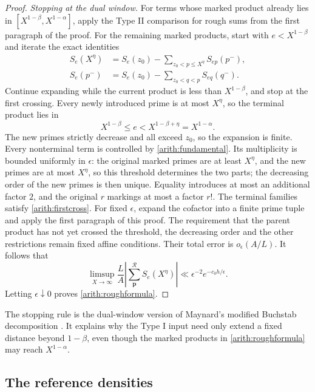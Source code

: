 \documentclass[11pt,a4paper]{article}
\theoremstyle{paperplain}
\numberwithin{equation}{section}
\begin{document}
\begin{proof}
\smallskip\noindent\emph{Stopping at the dual window.}\quad
For terms whose marked product already lies in
$[X^{1-\beta},X^{1-\alpha}]$, apply the Type II comparison for rough
sums from the first paragraph of the proof.
For the remaining marked products, start with $e<X^{1-\beta}$ and
iterate the exact identities
\begin{align}
 S_e(X^\eta)&=S_e(z_0)-\sum_{z_0<p\le X^\eta}S_{ep}(p^-),\label{arith:stop1}\\
 S_e(p^-)&=S_e(z_0)-\sum_{z_0<q<p}S_{eq}(q^-).\label{arith:stop2}
\end{align}
Continue expanding while the current product is less than
$X^{1-\beta}$, and stop at the first crossing.
Every newly introduced prime is at most $X^\eta$, so the terminal
product lies in
\begin{equation}\label{arith:firstcross}
 X^{1-\beta}\le e<X^{1-\beta+\eta}=X^{1-\alpha}.
\end{equation}
The new primes strictly decrease and all exceed $z_0$, so the
expansion is finite.
Every nonterminal term is controlled by \eqref{arith:fundamental}.
Its multiplicity is bounded uniformly in $\epsilon$: the original
marked primes are at least $X^\eta$, and the new primes are at most
$X^\eta$, so this threshold determines the two parts; the decreasing
order of the new primes is then unique.
Equality introduces at most an additional factor $2$, and the
original $r$ markings at most a factor $r!$.
The terminal families satisfy \eqref{arith:firstcross}.
For fixed $\epsilon$, expand the cofactor into a finite prime tuple
and apply the first paragraph of this proof.
The requirement that the parent product has not yet crossed the
threshold, the decreasing order and the other restrictions remain
fixed affine conditions.
Their total error is $o_\epsilon(A/L)$.
It follows that
\[
 \limsup_{X\to\infty}\frac LA
       \left|\sum_{\boldsymbol p}^{\mathcal R}S_e(X^\eta)\right|
 \ll\epsilon^{-2}e^{-c_0h/\epsilon}.
\]
Letting $\epsilon\downarrow0$ proves \eqref{arith:roughformula}.
\end{proof}

The stopping rule is the dual-window version of Maynard's modified
Buchstab decomposition \cite[Section 7, proof of Proposition 6.1]{Maynard2019}.
It explains why the Type I input need only extend a fixed distance
beyond $1-\beta$, even though the marked products in
\eqref{arith:roughformula} may reach $X^{1-\alpha}$.

\subsection{The reference densities}
\end{document}
